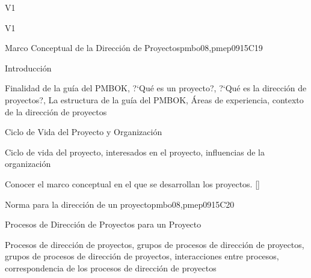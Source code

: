 \begin{syllabus}
\begin{outcomes}{V1}
    \item {}
    \item {}
    \item {}
\end{outcomes}

\begin{competences}{V1}
    \item {} 
    \item {}
    \item {}
    \item {}
    \item {}
    \item {}
    \item {}
    \item {}
\end{competences}

\begin{unit}{Marco Conceptual de la Dirección de Proyectos}{}{pmbo08,pmep09}{15}{C19}
\begin{topics}
      \item Introducción
       \item Finalidad de la guía del PMBOK, ?`Qué es un proyecto?, ?`Qué es la dirección de proyectos?, La estructura de la guía del PMBOK, Áreas de experiencia, contexto de la dirección de proyectos
      \item Ciclo de Vida del Proyecto y Organización
       \item Ciclo de vida del proyecto, interesados en el proyecto, influencias de la organización
   \end{topics}

   \begin{learningoutcomes}
      \item Conocer el marco conceptual en el que se desarrollan los proyectos. [\Usage]
   \end{learningoutcomes}
\end{unit}

\begin{unit}{Norma para la dirección de un proyecto}{}{pmbo08,pmep09}{15}{C20}
\begin{topics}
      \item Procesos de Dirección de Proyectos para un Proyecto
       \item Procesos de dirección de proyectos, grupos de procesos de dirección de proyectos, grupos de procesos de dirección de proyectos, interacciones entre procesos, correspondencia de los procesos de dirección de proyectos
   \end{topics}


\end{unit}
\end{syllabus}
